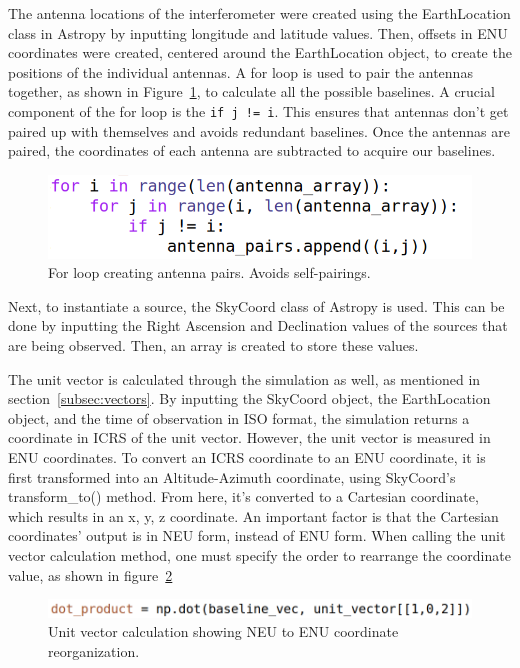 \documentclass[12pt]{article}
\begin{document}
The antenna locations of the interferometer were created using the EarthLocation class in Astropy by inputting longitude and latitude values. Then, offsets in ENU coordinates were created, centered around the EarthLocation object, to create the positions of the individual antennas. A for loop is used to pair the antennas together, as shown in Figure~\ref{fig:antenna_for_loop}, to calculate all the possible baselines. A crucial component of the for loop is the \texttt{if j != i}. This ensures that antennas don't get paired up with themselves and avoids redundant baselines. Once the antennas are paired, the coordinates of each antenna are subtracted to acquire our baselines. 
\begin{figure}[h]
    \centering
    \includegraphics[width=0.5\linewidth]{antenna_for_loop.png}
    \caption{For loop creating antenna pairs. Avoids self-pairings.}
    \label{fig:antenna_for_loop}
\end{figure}

Next, to instantiate a source, the SkyCoord class of Astropy is used. This can be done by inputting the Right Ascension and Declination values of the sources that are being observed. Then, an array is created to store these values. 

The unit vector is calculated through the simulation as well, as mentioned in section~\ref{subsec:vectors}. By inputting the SkyCoord object, the EarthLocation object, and the time of observation in ISO format, the simulation returns a coordinate in ICRS of the unit vector. However, the unit vector is measured in ENU coordinates. To convert an ICRS coordinate to an ENU coordinate, it is first transformed into an Altitude-Azimuth coordinate, using SkyCoord's transform\_to() method. From here, it's converted to a Cartesian coordinate, which results in an x, y, z coordinate. An important factor is that the Cartesian coordinates' output is in NEU form, instead of ENU form. When calling the unit vector calculation method, one must specify the order to rearrange the coordinate value, as shown in figure~\ref{fig:unit_vector}

\begin{figure}[h]
    \centering
    \includegraphics[width=0.75\linewidth]{unit_vector.png}
    \caption{Unit vector calculation showing NEU to ENU coordinate reorganization.}
    \label{fig:unit_vector}
\end{figure}
\end{document}
